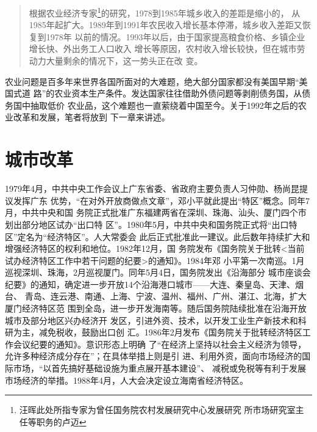 \begin{quotation}
  根据农业经济专家\footnote{汪晖此处所指专家为曾任国务院农村发展研究中心发展研究
    所市场研究室主任等职务的卢迈}的研究，1978到1985年城乡收入的差距是缩小的，
  从1985年起扩大。1989年到1991年农民收入增长基本停滞，城乡收入差距又恢复到1978年
  以前的情况。1993年以后，由于国家提高粮食价格、乡镇企业增长快、外出务工人口收入
  增长等原因，农村收入增长较快，但在城市劳动力大量剩余的情况下，这一势头正在改
  变。\cite{wangxiandai}

\end{quotation}

农业问题是百多年来世界各国所面对的大难题，绝大部分国家都没有美国早期“美国式道
路”的农业资本生产条件。发达国家往往借助外债问题等剥削债务国，从债务国中抽取低价
农业品，这个难题也一直萦绕着中国至今。关于1992年之后的农业改革和发展，笔者将放到
下一章来讲述。




\section{城市改革}

1979年4月，中共中央工作会议上广东省委、省政府主要负责人习仲勋、杨尚昆提议发挥广东
优势，“在对外开放商做点文章”，邓小平就此提出“特区”概念。同年7月，中共中央和国
务院正式批准广东福建两省在深圳、珠海、汕头、厦门四个市划出部分地区试办“出口特
区”。1980年5月，中共中央和国务院正式将“出口特区”定名为“经济特区”。人大常委会
此后正式批准此一建议。此后数年持续扩大和增强经济特区的权利和地位。1982年12月，国
务院发布《国务院关于批转<当前试办经济特区工作中若干问题的纪要>的通知》。1984年邓
小平第一次南巡。1月巡视深圳、珠海，2月巡视厦门。同年5月4日，国务院发出《沿海部分
城市座谈会纪要》的通知，确定进一步开放14个沿海港口城市——大连、秦皇岛、天津、烟台、
青岛、连云港、南通、上海、宁波、温州、福州、广州、湛江、北海，扩大厦门经济特区范
围到全岛，进一步开发海南等。随后国务院陆续批准在沿海开放城市及部分地区兴办经济开
发区，引进外资、技术，以开发工业生产新技术和科研为主，减免税收，鼓励出口创
汇。1986年2月发布《国务院关于批转经济特区工作会议纪要的通知》。意识形态上明确
了“在经济上坚持以社会主义经济为领导，允许多种经济成分存在”；在具体举措上则是引
进、利用外资，面向市场经济的国际市场，“以首先搞好基础设施为重点展开基本建设”、
减税或免税等有利于发展市场经济的举措。1988年4月，人大会决定设立海南省经济特区。

